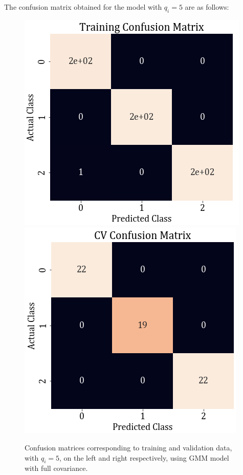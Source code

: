 \documentclass[11pt,a4paper]{article}
\newcommand{\noi}{\noindent}
\begin{document}
\noi
The confusion matrix obtained for the model with $q_i=5$ are as follows:
\begin{figure}[H]
    \centering
    \includegraphics[scale=0.5]{images/1B/1b_full_train_conf.png}
    \includegraphics[scale=0.5]{images/1B/1b_full_val_conf.png}
    \caption{Confusion matrices corresponding to training and validation data, with $q_i=5$, on the left and right respectively, using GMM model with full covariance.}
\end{figure}
\vspace{-1em}
\end{document}
